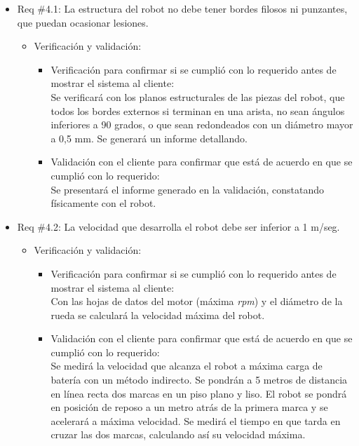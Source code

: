 \documentclass[11pt]{charter}
\begin{document}
\begin{itemize}
\item Req \#4.1: La estructura del robot no debe tener bordes filosos ni punzantes, que puedan ocasionar lesiones. 
\begin{itemize}
\item Verificación y validación:
	\begin{itemize}
	\item Verificación para confirmar si se cumplió con lo requerido 	antes de mostrar el sistema al cliente:\\
	Se verificará con los planos estructurales de las piezas del
	robot, que todos los bordes externos si terminan en una arista,
	no sean ángulos inferiores a 90 grados, o que sean redondeados
	con un diámetro mayor a 0,5 mm. Se generará un informe
	detallando.
	\item Validación con el cliente para confirmar que está de 				acuerdo en que se cumplió con lo requerido:\\
	Se presentará el informe generado en la validación, constatando  
	físicamente con el robot.
	\end{itemize}
\end{itemize}
\end{itemize}

\begin{itemize}
\item Req \#4.2: La velocidad que desarrolla el robot debe ser inferior a 1 m/seg. 
\begin{itemize}
\item Verificación y validación:
	\begin{itemize}
	\item Verificación para confirmar si se cumplió con lo requerido 	antes de mostrar el sistema al cliente:\\
 	Con las hojas de datos del motor (máxima \textit{rpm}) y el
 	diámetro de la rueda se calculará la velocidad máxima del robot.
	\item Validación con el cliente para confirmar que está de 				acuerdo en que se cumplió con lo requerido:\\
	Se medirá la velocidad que alcanza el robot a máxima carga de
	batería con un método indirecto. Se pondrán a 5 metros de
	distancia en línea recta dos marcas en un piso plano y liso. El
	robot se pondrá en posición de reposo a un metro atrás de la
	primera marca y se acelerará a máxima velocidad. Se medirá el
	tiempo en que tarda en cruzar las dos marcas, calculando así su
	velocidad máxima.   
	\end{itemize}
\end{itemize}
\end{itemize}
\end{document}
